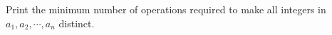 Print the minimum number of operations required to make all integers in $a_1,a_2,\cdots,a_n$ distinct.